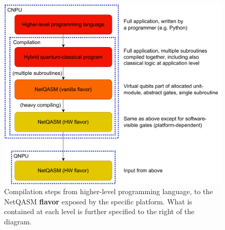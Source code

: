 \begin{figure}
      \centering
      \includegraphics[width=0.7\linewidth]{figures/netqasm/comp-chain.pdf}
      \caption{Compilation steps from higher-level programming language, to the
            \ac{NetQASM} \textbf{flavor} exposed by the specific platform. What is
            contained at each level is further specified to the right of the
            diagram.}
      \label{netqasm:fig:comp_chain}
\end{figure}

